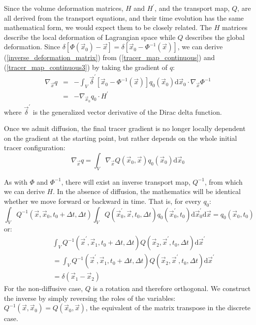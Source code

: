 \documentclass[11pt]{article}
\begin{document}
Since the volume deformation matrices,
$H$ and $H^\prime$, and the transport map, $Q$, are all derived from the
transport equations, and their time evolution has the same mathematical form,
we would expect them to be closely related. 
The $H$ matrices describe the local deformation of Lagrangian space 
while $Q$ describes the global deformation.
Since $\delta \left [\Phi(\vec x_0) - \vec x \right ]=\delta \left [\vec x_0 - \Phi^{-1}(\vec x) \right ]$,
we can derive (\ref{inverse_deformation_matrix}) from
(\ref{tracer_map_continuous}) and (\ref{tracer_map_continuous3}) by taking 
the gradient of $q$:
\begin{eqnarray}
	\nabla_{\vec x} q & = & - \int_V \vec \delta^\prime \left [\vec x_0 - \Phi^{-1}(\vec x) \right ] q_0 (\vec x_0) 
	\mathrm d \vec x_0 \cdot \nabla_{\vec x} \Phi^{-1} \\
	& = & - \nabla_{\vec x_0} q_0 \cdot H^\prime
\end{eqnarray}
where $\vec \delta^\prime$ is the generalized vector derivative of the 
Dirac delta function.

Once we admit diffusion, the final tracer gradient is no longer locally 
dependent on the gradient at the starting point, but rather depends on the
whole initial tracer configuration:
\begin{equation}
	\nabla_{\vec x} q = \int_V \nabla_{\vec x} Q(\vec x_0, \vec x) q_0 (\vec x_0) \mathrm d \vec x_0
\end{equation}

As with $\Phi$ and $\Phi^{-1}$, 
there will exist an inverse transport map, $Q^{-1}$, from which we can derive
$H$. In the absence of diffusion, the mathematics will be identical whether
we move forward or backward in time.
That is, for every $q_0$:
\begin{equation}
	\int_V Q^{-1}(\vec x, \vec x_0, t_0+\Delta t, \Delta t) 
	\int_V Q(\vec x_0^\prime, \vec x, t_0, \Delta t) 
	q_0(\vec x_0^\prime, t_0) 
	\mathrm d \vec x_0^\prime \mathrm d \vec x = q_0(\vec x_0, t_0)
\end{equation}
or:
\begin{eqnarray}
	& & \int_V  Q^{-1}(\vec x^\prime, \vec x_1, t_0+\Delta t, \Delta t)
	Q(\vec x_2, \vec x^\prime, t_0, \Delta t) \mathrm d \vec x^\prime \\
	& & = \int_V  Q^{-1}(\vec x^\prime, \vec x_1, t_0+\Delta t, \Delta t)
	Q(\vec x_2, \vec x^\prime, t_0, \Delta t) \mathrm d \vec x^\prime \\ 
	& & = \delta(\vec x_1 - \vec x_2)
\end{eqnarray}
For the non-diffusive case, $Q$ is a rotation and therefore orthogonal.
We construct the inverse by simply reversing the roles of the variables:
$Q^{-1}(\vec x, \vec x_0) = Q(\vec x_0, \vec x)$, 
the equivalent of the matrix transpose in the discrete case.
\end{document}
